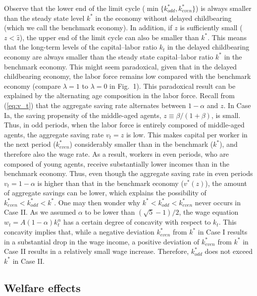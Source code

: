 \documentclass[nogrid]{MBE}%
\begin{document}
{Observe that the lower end of the limit cycle ($\min\{k_{odd}^{\ast}%
,k_{even}^{\ast}\}$) is always smaller than the steady state level $k^{\ast}$ in the economy
without delayed childbearing (which we call the benchmark economy). In addition, if $z$ is
sufficiently small ($z<\widehat z$), the upper end of the limit cycle can also be smaller than
$k^{\ast}$. This means that the long-term levels of the capital--labor ratio $k_{t}$ in the
delayed childbearing economy are always smaller than the steady state capital--labor ratio $k^{*}$
in the benchmark economy. This might seem paradoxical, given that in the delayed childbearing
economy, the labor force remains low compared with the benchmark economy (compare $\lambda=1$ to
$\lambda=0$ in Fig.~1). This paradoxical result can be explained by the alternating age
composition in the labor force. Recall from (\ref{eq:v_t}) that the aggregate saving rate
alternates between $1-\alpha$ and $z$. In Case Ia, the saving propensity of the middle-aged
agents, $z\equiv\beta/(1+\beta)$, is small. Thus, in odd periods, when the labor force is entirely
composed of middle-aged agents, the aggregate saving rate $v_{t}=z$ is low. This makes capital per
worker in the next period ($k^{*}_{even}$) considerably smaller than in the benchmark ($k^{*}$),
and therefore also the wage rate. As a result, workers in even periods, who are composed of young
agents, receive substantially lower incomes than in the benchmark economy. Thus, even though the
aggregate saving rate in even periods $v_{t}=1-\alpha$ is higher than that in the benchmark
economy ($v^{*}(z)$), the amount of aggregate savings can be
lower, which explains the possibility of $k^{*}_{even}<k^{*}_{odd}<k^{*}%
$. {One may then wonder why $k^{\ast}<k_{odd}^{\ast}<k_{even}^{\ast}$ never occurs in Case II. As
we assumed $\alpha$ to be lower than $\left( \sqrt{5}-1\right)  /2$, the wage equation
$w_{t}=A(1-\alpha)k_{t}^{\alpha}$ has a certain degree of concavity with respect to $k_{t}$. This
concavity implies that, while a negative deviation $k^{*}_{even}$ from $k^{\ast}$ in Case I
results in a substantial drop in the wage income, a positive deviation of $k^{*}_{even}$ from
$k^{\ast}$ in Case II results in a relatively small wage increase. Therefore, $k_{odd}^{\ast}$
does not exceed $k^{\ast}$ in Case II. \label{foot:K_Flu_Effect}}

\subsection{Welfare effects\label{sec:Welfare}}

}
\end{document}

